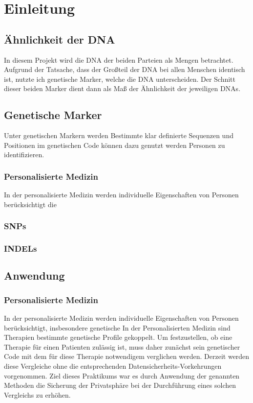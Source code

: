 \chapter{Einleitung}
\label{sec:Chapter1}


\section{Ähnlichkeit der DNA}
In diesem Projekt wird die DNA der beiden Parteien als Mengen betrachtet.
Aufgrund der Tatsache, dass der Großteil der DNA bei allen Menschen identisch ist, nutzte ich genetische Marker, welche die DNA unterscheiden.
Der Schnitt dieser beiden Marker dient  dann als Maß der Ähnlichkeit  der jeweiligen DNAs.
\section{Genetische Marker}

Unter genetischen Markern werden Bestimmte klar definierte Sequenzen und Positionen im genetischen Code können dazu genutzt werden Personen zu identifizieren.

\subsection{Personalisierte Medizin}
In der personalisierte Medizin werden individuelle Eigenschaften von Personen berücksichtigt die  

\subsection{SNPs}


\subsection{INDELs}

\section{Anwendung}

\subsection{Personalisierte Medizin}
In der personalisierte Medizin werden individuelle Eigenschaften von Personen berücksichtigt, insbesondere genetische 
In der Personalisierten Medizin sind  Therapien bestimmte genetische Profile  gekoppelt.
Um festzustellen, ob eine Therapie für einen Patienten zulässig ist, muss daher zunächst sein genetischer Code mit dem für diese Therapie notwendigem verglichen werden.
Derzeit werden diese Vergleiche ohne die entsprechenden Datensicherheits-Vorkehrungen vorgenommen.
Ziel dieses Praktikums war es durch Anwendung der genannten Methoden die Sicherung der Privatsphäre bei der Durchführung eines solchen Vergleichs zu erhöhen.

